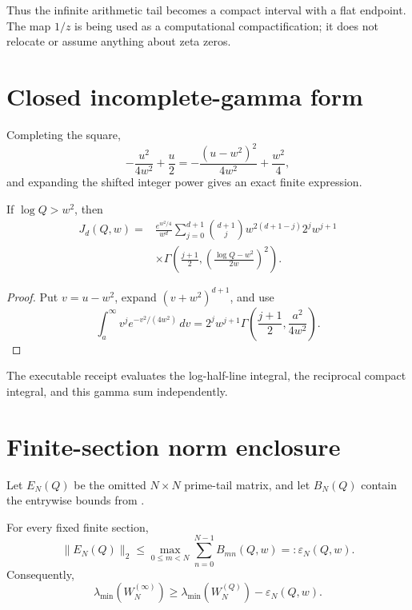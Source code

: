 Thus the infinite arithmetic tail becomes a compact interval with a flat
endpoint. The map $1/z$ is being used as a computational compactification;
it does not relocate or assume anything about zeta zeros.

\section{Closed incomplete-gamma form}

Completing the square,
\[
 -\frac{u^2}{4w^2}+\frac u2
 =-\frac{(u-w^2)^2}{4w^2}+\frac{w^2}{4},
\]
and expanding the shifted integer power gives an exact finite expression.

\begin{theorem}
\label{thm:tail-gamma-identity}
If $\log Q>w^2$, then
\[
\begin{aligned}
J_d(Q,w)
={}&\frac{e^{w^2/4}}{w^d}
\sum_{j=0}^{d+1}\binom{d+1}{j}
 w^{2(d+1-j)}2^jw^{j+1}\\
&\times\Gamma\!\left(
 \frac{j+1}{2},
 \left(\frac{\log Q-w^2}{2w}\right)^2
\right).
\end{aligned}
\]
\end{theorem}

\begin{proof}
Put $v=u-w^2$, expand $(v+w^2)^{d+1}$, and use
\[
 \int_a^\infty v^j e^{-v^2/(4w^2)}\,dv
 =2^jw^{j+1}\Gamma\!\left(\frac{j+1}{2},\frac{a^2}{4w^2}\right).
\]
\end{proof}

The executable receipt evaluates the log-half-line integral, the reciprocal
compact integral, and this gamma sum independently.

\section{Finite-section norm enclosure}

Let $E_N(Q)$ be the omitted $N\times N$ prime-tail matrix, and let
$B_N(Q)$ contain the entrywise bounds from
.

\begin{corollary}
\label{cor:tail-operator-envelope}
For every fixed finite section,
\[
 \|E_N(Q)\|_2
 \le \max_{0\le m<N}\sum_{n=0}^{N-1}B_{mn}(Q,w)
 =:\varepsilon_N(Q,w).
\]
Consequently,
\[
 \lambda_{\min}(W_N^{(\infty)})
 \ge
 \lambda_{\min}(W_N^{(Q)})-\varepsilon_N(Q,w).
\]
\end{corollary}

